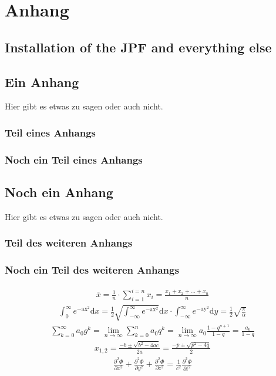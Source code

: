 \appendix
\chapter{Anhang}
\section{Installation of the JPF and everything else}

\section{Ein Anhang}
Hier gibt es etwas zu sagen oder auch nicht.
\subsection{Teil eines Anhangs}
\blindtext
\subsection{Noch ein Teil eines Anhangs}
\blinditemize
\section{Noch ein Anhang}
Hier gibt es etwas zu sagen oder auch nicht.
\subsection{Teil des weiteren Anhangs}
\blindenumerate
\subsection{Noch ein Teil des weiteren Anhangs}

\blindtext
\begin{align}
\bar x=\frac 1n\cdot\sum_{i=1}^{i=n}x_i=\frac{x_1+x_2+\ldots+x_n}{n}
\end{align}
\blindtext
\begin{align}
\int_0^\infty e^\mathrm{-ax^2}\mathrm dx=\frac 12\sqrt{\int_{-\infty}^\infty e^\mathrm{-ax^2}}\mathrm dx\cdot\int_{-\infty}^\infty e^\mathrm{-ay^2}\mathrm dy=\frac 12\sqrt{\frac{\pi}{\alpha}}
\end{align}
\blindtext
\begin{align}
\sum_{k=0}^\infty a_0g^k=\lim_{n\to\infty}\sum_{k=0}^na_0q^k=\lim_{n\to\infty}a_0\frac{1-q^{n+1}}{1-q}=\frac{a_0}{1-q}
\end{align}
\blindtext
\begin{align}
x_{1,2}=\frac{-b\pm\sqrt{b^2-4ac}}{2a}=\frac{-p\pm\sqrt{p^2-4q}}{2}
\end{align}
\blindtext
\begin{align}
\frac{\partial^2\Phi}{\partial x^2}+\frac{\partial^2\Phi}{\partial y^2}+\frac{\partial^2\Phi}{\partial z^2}=\frac{1}{c^2}\frac{\partial^2\Phi}{\partial t^2}
\end{align}
\blindtext